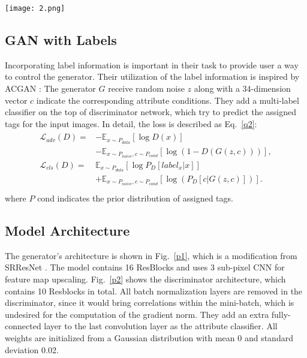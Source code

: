 \documentclass[10pt,twocolumn,letterpaper]{article}
\begin{document}
\begin{figure*}
	\begin{center}
		\texttt{[image: 2.png]}
	\end{center}
	\caption{Discriminator Architecture}
	\label{p2}
\end{figure*}

\subsection{GAN with Labels}

Incorporating label information is important in their task to provide user a way to control the generator. Their utilization of the label information is inspired by ACGAN \cite{Jin2017Towards}: The generator $G$ receive random noise $z$ along with a 34-dimension vector $c$ indicate the corresponding attribute conditions. They add a multi-label classifier on the top of discriminator network, which try to predict the assigned tags for the input images. In detail, the loss is described as Eq.~\ref{q2}:
\begin{equation}
\begin{aligned}
\begin{split} \mathcal{L}_{adv}(D)=&-\mathbb{E}_{x\sim P_{data}}[\log D(x)]\\
&-\mathbb{E}_{x\sim P_{noise},c\sim P_{cond}}[\log (1-D(G(z,c)))],\\ \mathcal{L}_{cls}(D)=&\mathbb{E}_{x\sim P_{data}}[\log P_D[label_x|x]]\\
&+\mathbb{E}_{x\sim P_{noise},c\sim P_{cond}}[\log (P_D[c|G(z,c)])].\\
\label{q2}
\end{split}
\end{aligned}
\end{equation}
where $P$ cond indicates the prior distribution of assigned tags.

\subsection{Model Architecture}
The generator's architecture is shown in Fig.~\ref{p1}, which is a modification from SRResNet \cite{Ledig2017Photo}. The model contains 16 ResBlocks and uses 3 sub-pixel CNN \cite{Shi2016Real} for feature map upscaling. Fig.~\ref{p2} shows the discriminator architecture, which contains 10 Resblocks in total. All batch normalization layers are removed in the discriminator, since it would bring correlations within the mini-batch, which is undesired for the computation of the gradient norm. They add an extra fully-connected layer to the last convolution layer as the attribute classifier. All weights are initialized from a Gaussian distribution with mean 0 and standard deviation 0.02.
\end{document}
